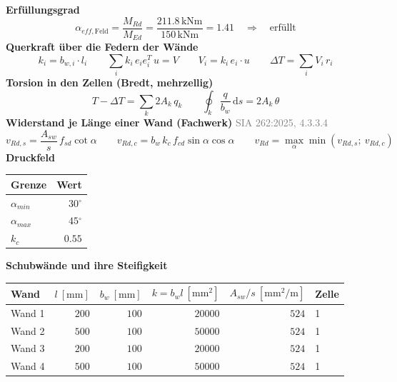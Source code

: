 \documentclass[11pt,a4paper]{article}
\newcommand{\normref}[1]{{\small\textcolor{gray}{#1}}}
\begin{document}
\noindent\textbf{Erfüllungsgrad}
\begin{equation*}
\alpha_{eff,\text{Feld}} = \frac{M_{Rd}}{M_{Ed}} = \frac{211.8\,\mathrm{kNm}}{150\,\mathrm{kNm}} = 1.41 \quad \Rightarrow \quad \text{erfüllt}
\end{equation*}
\noindent\textbf{Querkraft über die Federn der Wände}
\begin{equation*}
k_i = b_{w,i} \cdot l_i \qquad \sum_i k_i\, e_i e_i^T\, u = V \qquad V_i = k_i\, e_i \cdot u \qquad \Delta T = \sum_i V_i\, r_i
\end{equation*}
\noindent\textbf{Torsion in den Zellen (Bredt, mehrzellig)}
\begin{equation*}
T - \Delta T = \sum_k 2 A_k\, q_k \qquad \oint_k \frac{q}{b_w}\, \mathrm{d}s = 2 A_k\, \theta
\end{equation*}
\noindent\textbf{Widerstand je Länge einer Wand (Fachwerk)} \hfill \normref{SIA 262:2025, 4.3.3.4}
\begin{equation*}
v_{Rd,s} = \frac{A_{sw}}{s}\, f_{sd} \cot\alpha \qquad v_{Rd,c} = b_w\, k_c\, f_{cd} \sin\alpha \cos\alpha \qquad v_{Rd} = \max_\alpha \min(v_{Rd,s};\ v_{Rd,c})
\end{equation*}
\noindent\textbf{Druckfeld}
\begin{longtable}{lr}
\hline
Grenze & Wert \\
\hline
\endhead
$\alpha_{min}$ & $30{}^{\circ}$ \\
$\alpha_{max}$ & $45{}^{\circ}$ \\
$k_c$ & $0.55$ \\
\hline
\end{longtable}
\noindent\textbf{Schubwände und ihre Steifigkeit}
\begin{longtable}{lrrrrl}
\hline
Wand & $l\ [\mathrm{mm}]$ & $b_w\ [\mathrm{mm}]$ & $k = b_w l\ [\mathrm{mm}^2]$ & $A_{sw}/s\ [\mathrm{mm^2/m}]$ & Zelle \\
\hline
\endhead
Wand 1 & $200$ & $100$ & $20000$ & $524$ & 1 \\
Wand 2 & $500$ & $100$ & $50000$ & $524$ & 1 \\
Wand 3 & $200$ & $100$ & $20000$ & $524$ & 1 \\
Wand 4 & $500$ & $100$ & $50000$ & $524$ & 1 \\
\hline
\end{longtable}
\end{document}
